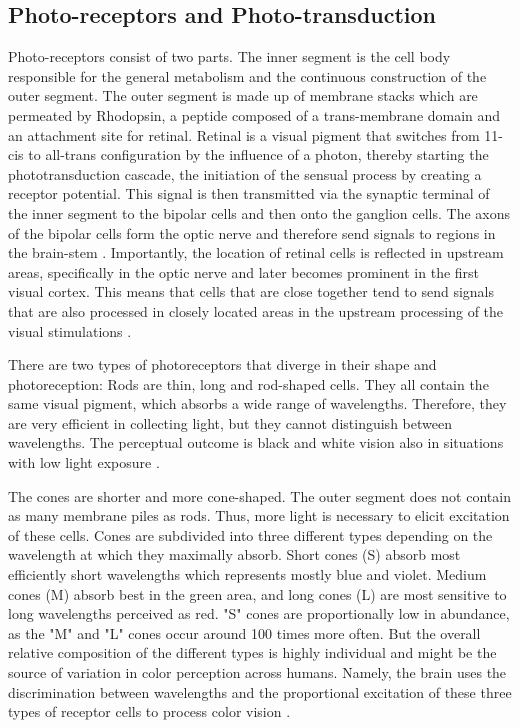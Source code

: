 \subsection{Photo-receptors and Photo-transduction}
Photo-receptors consist of two parts. The inner segment is the cell body responsible for the general metabolism and the continuous construction of the outer segment. The outer segment is made up of membrane stacks which are permeated by Rhodopsin, a peptide composed of a trans-membrane domain and an attachment site for retinal. Retinal is a visual pigment that switches from 11-cis to all-trans configuration by the influence of a photon, thereby starting the phototransduction cascade, the initiation of the sensual process by creating a receptor potential. This signal is then transmitted via the synaptic terminal of the inner segment to the bipolar cells and then onto the ganglion cells. The axons of the bipolar cells form the optic nerve and therefore send signals to regions in the brain-stem \parencite{kolb1995webvision}. Importantly, the location of retinal cells is reflected in upstream areas, specifically in the optic nerve and later becomes prominent in the first visual cortex. This means that cells that are close together tend to send signals that are also processed in closely located areas in the upstream processing of the visual stimulations \parencite{selhorst2009optic}.


There are two types of photoreceptors that diverge in their shape and photoreception: Rods are thin, long and rod-shaped cells. They all contain the same visual pigment, which absorbs a wide range of wavelengths. Therefore, they are very efficient in collecting light, but they cannot distinguish between wavelengths. The perceptual outcome is black and white vision also in situations with low light exposure \parencite{kolb1995webvision}.

The cones are shorter and more cone-shaped. The outer segment does not contain as many membrane piles as rods. Thus, more light is necessary to elicit excitation of these cells. Cones are subdivided into three different types depending on the wavelength at which they maximally absorb. Short cones (S) absorb most efficiently short wavelengths which represents mostly blue and violet. Medium cones (M) absorb best in the green area, and long cones (L) are most sensitive to long wavelengths perceived as red. "S" cones are proportionally low in abundance, as the "M" and "L" cones occur around 100 times more often. But the overall relative composition of the different types is highly individual and might be the source of variation in color perception across humans. Namely, the brain uses the discrimination between wavelengths and the proportional excitation of these three types of receptor cells to process color vision \parencite{kolb1995webvision}.

